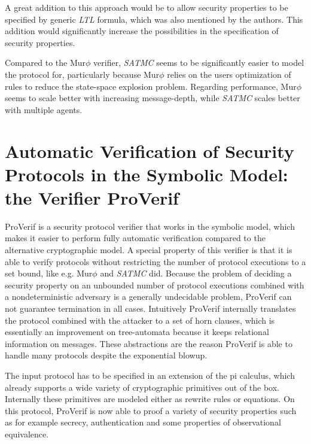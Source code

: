 \documentclass[a4paper,UKenglish]{lipics-v2018}
\def\murphi{Mur$\phi$ }
\begin{document}
A great addition to this approach would be to allow security properties to be specified by generic \textit{LTL} formula, which was also mentioned by the authors. This addition would significantly increase the possibilities in the specification of security properties.

Compared to the \murphi verifier, \textit{SATMC} seems to be significantly easier to model the protocol for, particularly because \murphi relies on the users optimization of rules to reduce the state-space explosion problem. Regarding performance, \murphi seems to scale better with increasing message-depth, while \textit{SATMC} scales better with multiple agents.




\section{Automatic Verification of Security Protocols in the Symbolic Model: the Verifier ProVerif}

ProVerif is a security protocol verifier that works in the symbolic model, which makes it easier to perform fully automatic verification compared to the alternative cryptographic model. 
A special property of this verifier is that it is able to verify protocols without restricting the number of protocol executions to a set bound, like e.g. \murphi \cite{murphi} and \textit{SATMC}\cite{sat} did. Because the problem of deciding a security property on an unbounded number of protocol executions combined with a nondeterministic adversary is a generally undecidable problem, ProVerif can not guarantee termination in all cases. Intuitively ProVerif internally translates the protocol combined with the attacker to a set of horn clauses, which is essentially an improvement on tree-automata because it keeps relational information on messages. These abstractions are the reason ProVerif is able to handle many protocols despite the exponential blowup.\cite{ProVerif}

The input protocol has to be specified in an extension of the pi calculus, which already supports a wide variety of cryptographic primitives out of the box. Internally these primitives are modeled either as rewrite rules or equations. On this protocol, ProVerif is now able to proof a variety of security properties such as for example secrecy, authentication and some properties of observational equivalence.\cite{ProVerif}
\end{document}
